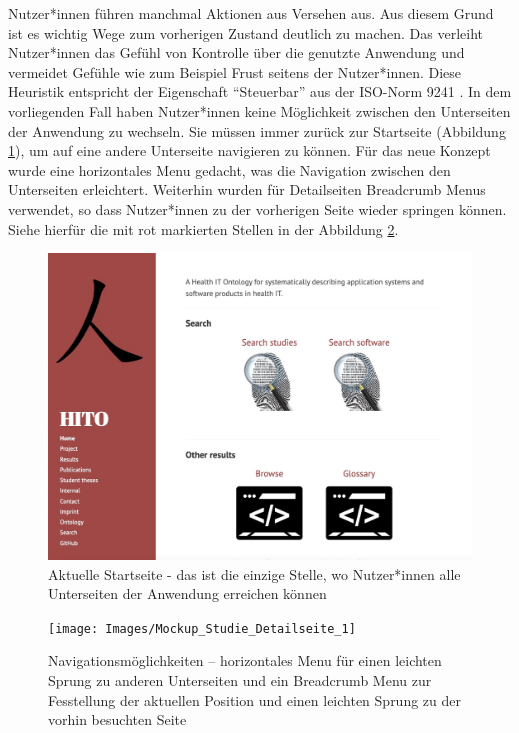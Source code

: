 \begin{enumerate}
Nutzer*innen führen manchmal Aktionen aus Versehen aus. 
Aus diesem Grund ist es wichtig Wege zum vorherigen Zustand deutlich zu machen.
Das verleiht Nutzer*innen das Gefühl von Kontrolle über die genutzte Anwendung und vermeidet Gefühle wie zum Beispiel Frust seitens der Nutzer*innen.
Diese Heuristik entspricht der Eigenschaft \enquote{Steuerbar} aus der ISO-Norm 9241 \citep{ISO_standard}.
In dem vorliegenden Fall haben Nutzer*innen keine Möglichkeit zwischen den Unterseiten der Anwendung zu wechseln.
Sie müssen immer zurück zur Startseite (Abbildung \ref{fig:point3_davor}), um auf eine andere Unterseite navigieren zu können.
Für das neue Konzept wurde eine horizontales Menu gedacht, was die Navigation zwischen den Unterseiten erleichtert.
Weiterhin wurden für Detailseiten Breadcrumb Menus verwendet, so dass Nutzer*innen zu der vorherigen Seite wieder springen können.
Siehe hierfür die mit rot markierten Stellen in der Abbildung \ref{fig:point3_danach}.

\begin{figure}[H]
	\centering
    	\includegraphics[width=1.45\textwidth, angle=90]{Images/Punkt_3_davor}
   	\caption[Aktuelle Startseite]{Aktuelle Startseite - das ist die einzige Stelle, wo Nutzer*innen alle Unterseiten der Anwendung erreichen können}
   	\label{fig:point3_davor}
\end{figure}

\begin{figure}[ht]
	\centering
    	\texttt{[image: Images/Mockup\_Studie\_Detailseite\_1]}
   	\caption[Navigationsmöglichkeiten]{Navigationsmöglichkeiten -- horizontales Menu für einen leichten Sprung zu anderen Unterseiten und ein Breadcrumb Menu zur Fesstellung der aktuellen Position und einen leichten Sprung zu der vorhin besuchten Seite}
   	\label{fig:point3_danach}
\end{figure}


\end{enumerate}
